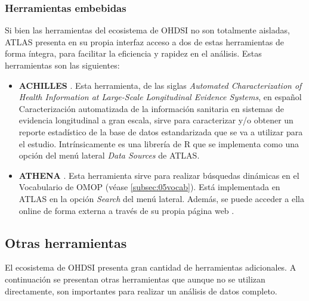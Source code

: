 \subsubsection{Herramientas embebidas}

Si bien las herramientas del ecosistema de OHDSI no son totalmente aisladas, ATLAS presenta en su propia interfaz acceso a dos de estas herramientas de forma íntegra, para facilitar la eficiencia y rapidez en el análisis. Estas herramientas son las siguientes:

\begin{itemize}

    \item \textbf{ACHILLES} \cite{githubACHILLES}. Esta herramienta, de las siglas \textit{Automated Characterization of Health Information at Large-Scale Longitudinal Evidence Systems}, en español Caracterización automatizada de la información sanitaria en sistemas de evidencia longitudinal a gran escala, sirve para caracterizar y/o obtener un reporte estadístico de la base de datos estandarizada que se va a utilizar para el estudio. Intrínsicamente es una librería de R que se implementa como una opción del menú lateral \textit{Data Sources} de ATLAS.
    \item \textbf{ATHENA} \cite{githubATHENA}. Esta herramienta sirve para realizar búsquedas dinámicas en el Vocabulario de OMOP (véase \ref{subsec:05vocab}). Está implementada en ATLAS en la opción \textit{Search} del menú lateral. Además, se puede acceder a ella online de forma externa a través de su propia página web \cite{ATHENAweb}.
    
\end{itemize}


\subsection{Otras herramientas} \label{subsec:05otrasHerramientas}

El ecosistema de OHDSI presenta gran cantidad de herramientas adicionales. A continuación se presentan otras herramientas que aunque no se utilizan directamente, son importantes para realizar un análisis de datos completo. 

